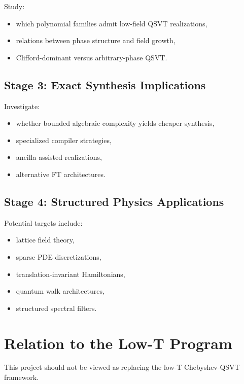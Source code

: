 \documentclass[12pt,a4paper]{article}
\begin{document}
Study:

\begin{itemize}
    \item which polynomial families admit low-field QSVT realizations,
    \item relations between phase structure and field growth,
    \item Clifford-dominant versus arbitrary-phase QSVT.
\end{itemize}

\subsection{Stage 3: Exact Synthesis Implications}

Investigate:

\begin{itemize}
    \item whether bounded algebraic complexity yields cheaper synthesis,
    \item specialized compiler strategies,
    \item ancilla-assisted realizations,
    \item alternative FT architectures.
\end{itemize}

\subsection{Stage 4: Structured Physics Applications}

Potential targets include:

\begin{itemize}
    \item lattice field theory,
    \item sparse PDE discretizations,
    \item translation-invariant Hamiltonians,
    \item quantum walk architectures,
    \item structured spectral filters.
\end{itemize}


\section{Relation to the Low-T Program}

This project should not be viewed as replacing the low-T Chebyshev-QSVT framework.
\end{document}
